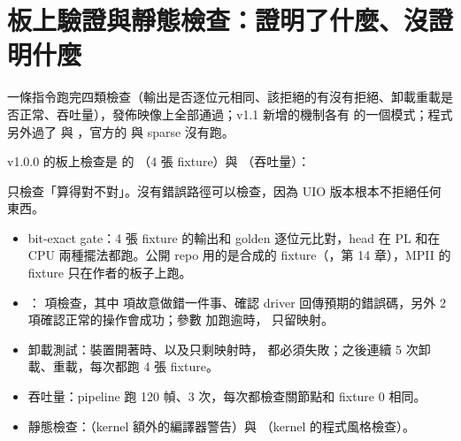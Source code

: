 \section{板上驗證與靜態檢查：證明了什麼、沒證明什麼}
\label{sec:verify}

\begin{oneline}
 一條指令跑完四類檢查（輸出是否逐位元相同、該拒絕的有沒有拒絕、卸載重載是否正常、吞吐量），發佈映像上全部通過；v1.1 新增的機制各有  的一個模式；程式另外過了  與 ，官方的  與 sparse 沒有跑。
\end{oneline}

\begin{before}
v1.0.0 的板上檢查是  的 （4 張 fixture）與 （吞吐量）：


只檢查「算得對不對」。沒有錯誤路徑可以檢查，因為 UIO 版本根本不拒絕任何東西。
\end{before}

\begin{tech}
\begin{itemize}
\item bit-exact gate：4 張 fixture 的輸出和 golden 逐位元比對，head 在 PL 和在 CPU 兩種擺法都跑。公開 repo 用的是合成的 fixture（，第 14 章），MPII 的 fixture 只在作者的板子上跑。
\item {}：\errChecks{} 項檢查，其中 \errRefusals{} 項故意做錯一件事、確認 driver 回傳預期的錯誤碼，另外 2 項確認正常的操作會成功；參數  加跑逾時， 只留映射。
\item 卸載測試：裝置開著時、以及只剩映射時， 都必須失敗；之後連續 5 次卸載、重載，每次都跑 4 張 fixture。
\item 吞吐量：pipeline 跑 120 幀、3 次，每次都檢查關節點和 fixture 0 相同。
\item 靜態檢查：（kernel 額外的編譯器警告）與 （kernel 的程式風格檢查）。
\end{itemize}
\end{tech}

